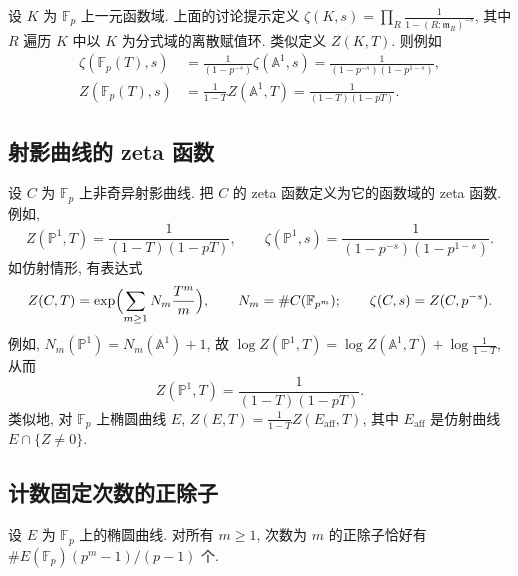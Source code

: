 设 $K$ 为 $\mathbb{F}_p$ 上一元函数域. 上面的讨论提示定义 $\zeta(K, s) = \prod_R\frac{1}{1-(R:\mathfrak{m}_R)^{-s}}$, 其中 $R$ 遍历 $K$ 中以 $K$ 为分式域的离散赋值环. 类似定义 $Z(K, T)$. 则例如
\begin{align*}
\zeta(\mathbb{F}_p(T), s) &= \frac{1}{(1-p^{-s})}\zeta(\mathbb{A}^1, s) = \frac{1}{(1-p^{-s})(1-p^{1-s})},\\
Z(\mathbb{F}_p(T), s) &= \frac{1}{1-T}Z(\mathbb{A}^1, T) = \frac{1}{(1-T)(1-pT)}.
\end{align*}

\subsection*{射影曲线的 zeta 函数}

设 $C$ 为 $\mathbb{F}_p$ 上非奇异射影曲线. 把 $C$ 的 zeta 函数定义为它的函数域的 zeta 函数. 例如,
\[
Z(\mathbb{P}^1, T) = \frac{1}{(1-T)(1-pT)}, \qquad
\zeta(\mathbb{P}^1, s) = \frac{1}{(1-p^{-s})(1-p^{1-s})}.
\]
如仿射情形, 有表达式
\[
Z(C, T) = \exp\Bigl(\sum_{m\ge 1}N_m\frac{T^m}{m}\Bigr), \qquad N_m = \#C(\mathbb{F}_{p^m}); \qquad
\zeta(C, s) = Z(C, p^{-s}).
\]
例如, $N_m(\mathbb{P}^1) = N_m(\mathbb{A}^1) + 1$, 故 $\log Z(\mathbb{P}^1, T) = \log Z(\mathbb{A}^1, T) + \log\frac{1}{1-T}$, 从而
\[
Z(\mathbb{P}^1, T) = \frac{1}{(1-T)(1-pT)}.
\]
类似地, 对 $\mathbb{F}_p$ 上椭圆曲线 $E$, $Z(E, T) = \frac{1}{1-T}Z(E_{\mathrm{aff}}, T)$, 其中 $E_{\mathrm{aff}}$ 是仿射曲线 $E\cap\{Z\neq 0\}$.

\subsection*{计数固定次数的正除子}

\begin{proposition} \label{thm:4.9.9} 
设 $E$ 为 $\mathbb{F}_p$ 上的椭圆曲线. 对所有 $m\ge 1$, 次数为 $m$ 的正除子恰好有 $\#E(\mathbb{F}_p)(p^m-1)/(p-1)$ 个.
\end{proposition}

